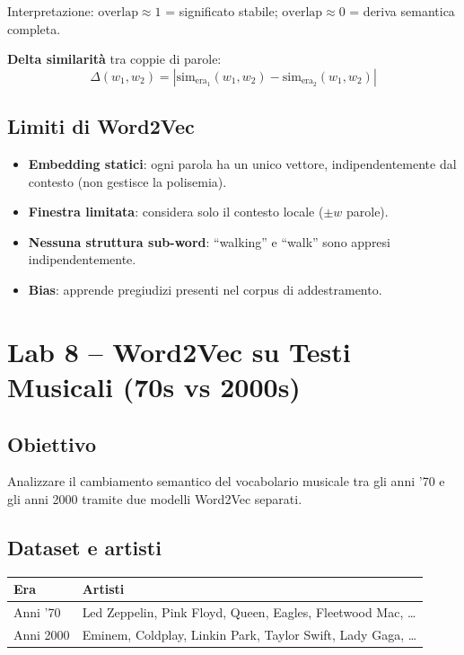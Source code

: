 \documentclass[12pt,a4paper]{article}
\begin{document}
Interpretazione: $\text{overlap} \approx 1$ = significato stabile; $\text{overlap} \approx 0$ = deriva semantica completa.

\textbf{Delta similarità} tra coppie di parole:
\[
\Delta(w_1, w_2) = |\text{sim}_{\text{era}_1}(w_1,w_2) - \text{sim}_{\text{era}_2}(w_1,w_2)|
\]

\subsection{Limiti di Word2Vec}

\begin{itemize}[leftmargin=1.5em]
  \item \textbf{Embedding statici}: ogni parola ha un unico vettore, indipendentemente dal contesto (non gestisce la polisemia).
  \item \textbf{Finestra limitata}: considera solo il contesto locale ($\pm w$ parole).
  \item \textbf{Nessuna struttura sub-word}: ``walking'' e ``walk'' sono appresi indipendentemente.
  \item \textbf{Bias}: apprende pregiudizi presenti nel corpus di addestramento.
\end{itemize}

\section{Lab 8 -- Word2Vec su Testi Musicali (70s vs 2000s)}

\subsection{Obiettivo}

Analizzare il cambiamento semantico del vocabolario musicale tra gli anni '70 e gli anni 2000 tramite due modelli Word2Vec separati.

\subsection{Dataset e artisti}

\begin{center}
\begin{tabular}{ll}
\toprule
\textbf{Era} & \textbf{Artisti} \\
\midrule
Anni '70 & Led Zeppelin, Pink Floyd, Queen, Eagles, Fleetwood Mac, \ldots \\
Anni 2000 & Eminem, Coldplay, Linkin Park, Taylor Swift, Lady Gaga, \ldots \\
\bottomrule
\end{tabular}
\end{center}
\end{document}

